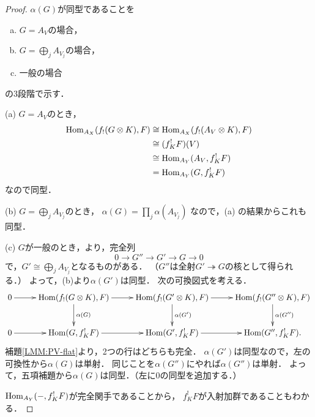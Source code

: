 \begin{proof}
    \(\alpha(G)\)が同型であることを
    \begin{enumerate}[(a)]\setlength{\leftskip}{22pt}
        \item \(G=A_V\)の場合，
        \item \(G=\bigoplus_jA_{V_j}\)の場合，
        \item 一般の場合
    \end{enumerate}
    の3段階で示す．

    (a) 
    \(G=A_V\)のとき，
    \begin{align*}
        \mathop{\mathrm{Hom}}\nolimits_{A_X}(f_!(G\otimes{K}),F)
        &\cong
        \mathop{\mathrm{Hom}}\nolimits_{A_X}(f_!(A_V\otimes{K}),F)\\
        &\cong
        (f^!_KF)(V)\\
        &\cong
        \mathop{\mathrm{Hom}}\nolimits_{A_Y}(A_V,f^!_KF)\\
        &=\mathop{\mathrm{Hom}}\nolimits_{A_Y}(G,f^!_KF)
    \end{align*}
    なので同型．

    (b) 
    \(G=\bigoplus_jA_{V_j}\)のとき，
    \(\alpha(G)=\prod_j\alpha(A_{V_j})\)
    なので，(a) の結果からこれも同型．

    (c) 
    \(G\)が一般のとき，\cite[Prop.2.4.12]{KS90}より，完全列
    \[
        0\to G''\to G'\to G\to0
    \]で，\(G'\cong\bigoplus_jA_{V_j}\)となるものがある．
    （\(G''\)は全射\(G'\twoheadrightarrow G\)の核として得られる．）
    よって，(b)より\(\alpha(G')\)は同型．
    次の可換図式を考える．
    \begin{equation*}
        \vcenter{\xymatrix
        @C=26pt@R=26pt
        {
        0\ar[r]
        &
        \Hom(f_!(G\otimes{K}),F)
        \ar[r]
        \ar[d]^-{\alpha(G)}
        &
        \Hom(f_!(G'\otimes{K}),F)
        \ar[r]
        \ar[d]^-{\alpha(G')}
        &
        \Hom(f_!(G''\otimes{K}),F)
        \ar[d]^-{\alpha(G'')} 
        \\
        0\ar[r]
        &
        \Hom(G,f_K^!F)
        \ar[r]
        &
        \Hom(G',f_K^!F)
        \ar[r]
        &
        \Hom(G'',f_K^!F).
        }}
    \end{equation*}
    補題\ref{LMM:PV-flat}より，2つの行はどちらも完全．
    \(\alpha(G')\)は同型なので，左の可換性から\(\alpha(G)\)は単射．
    同じことを\(\alpha(G'')\)にやれば\(\alpha(G'')\)は単射．
    よって，五項補題から\(\alpha(G)\)は同型．（左に0の同型を追加する．）

    \(\mathop{\mathrm{Hom}}\nolimits_{A_Y}(-,f_K^!F)\)が完全関手であることから，
    \(f_K^!F\)が入射加群であることもわかる．
\end{proof}

